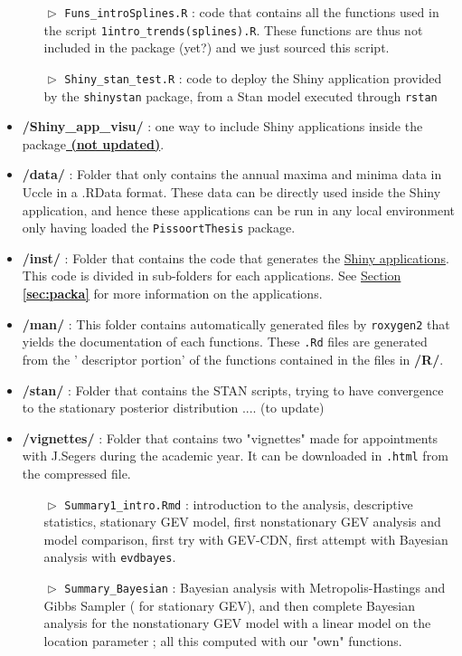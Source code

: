 \begin{itemize}
\begin{itemize}
\item[$\vartriangleright$]\texttt{Funs\_introSplines.R} : code that contains all the functions used in the script \texttt{1intro\_trends(splines).R}. These functions are thus not included in the package (yet?) and we just sourced this script.

\item[$\vartriangleright$]\texttt{Shiny\_stan\_test.R} : code to deploy the Shiny application provided by the \texttt{shinystan} package, from a Stan model executed through \texttt{rstan}

  \end{itemize}


\item \textbf{/Shiny\_app\_visu/} : one way to include Shiny applications inside the package\textbf{\underline{ (not updated)}}.


\item \textbf{/data/} : Folder that only contains the annual maxima and minima data in Uccle in a .RData format. These data can be directly used inside the Shiny application, and hence these applications can be run in any local environment only having loaded the   \texttt{PissoortThesis} package.

\item \textbf{/inst/} : Folder that contains the code that generates the \underline{Shiny applications}. This code is divided in sub-folders for each applications.  See \hyperref[sec:packa]{Section \textbf{\ref{sec:packa}}} for more information on the applications. 


\item \textbf{/man/} : This folder contains automatically generated files by \texttt{roxygen2} that yields the documentation of each functions. These \texttt{.Rd} files are generated from the ' descriptor portion' of the functions contained in the files in \textbf{/R/}.

\item \textbf{/stan/} : Folder that contains the STAN scripts, trying to have convergence to the stationary posterior distribution .... (to update)

\item \textbf{/vignettes/} : Folder that contains two "vignettes" made for appointments with J.Segers during the academic year. It can be downloaded in \texttt{.html} from the compressed file. 

\begin{itemize}
	\item[$\vartriangleright$] \texttt{Summary1\_intro.Rmd} : introduction to the analysis, descriptive statistics, stationary GEV model, first nonstationary GEV analysis and model comparison, first try with GEV-CDN, first attempt with Bayesian analysis with \texttt{evdbayes}.
		\item[$\vartriangleright$] \texttt{Summary\_Bayesian} : Bayesian analysis with Metropolis-Hastings and Gibbs Sampler ( for stationary GEV), and then complete Bayesian analysis for the nonstationary GEV model with a linear model on the location parameter ; all this computed with our "own" functions. 
\end{itemize}

\end{itemize}

